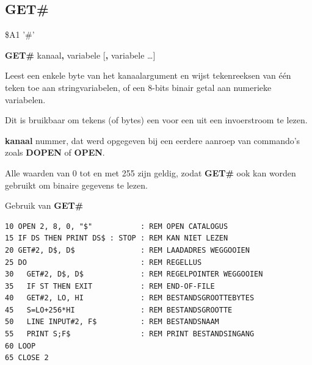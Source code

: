 \subsection{GET\#}
\begin{description}[leftmargin=2cm,style=nextline]
\item [Token:]    \$A1 '\#'

\item [Formaat:]   {\bf GET\#} kanaal{\bf,} variabele [{\bf,} variabele \dots]

\item [Gebruik:]    Leest een enkele byte van het kanaalargument en wijst tekenreeksen van één teken toe aan stringvariabelen, of een 8-bits binair getal aan numerieke variabelen.

                  Dit is bruikbaar om tekens (of bytes) een voor een uit een invoerstroom te lezen.

                  {\bf kanaal} nummer, dat werd opgegeven bij een eerdere aanroep van commando's zoals {\bf DOPEN} of {\bf OPEN}.

\item [Opmerkingen:]  Alle waarden van 0 tot en met 255 zijn geldig, zodat {\bf GET\#} ook kan worden gebruikt om binaire gegevens te lezen.

\item [Voorbeeld:]  Gebruik van {\bf GET\#}

\begin{tcolorbox}[colback=black,coltext=white]
\verbatimfont{\codefont}
\begin{verbatim}
10 OPEN 2, 8, 0, "$"           : REM OPEN CATALOGUS
15 IF DS THEN PRINT DS$ : STOP : REM KAN NIET LEZEN
20 GET#2, D$, D$               : REM LAADADRES WEGGOOIEN
25 DO                          : REM REGELLUS
30   GET#2, D$, D$             : REM REGELPOINTER WEGGOOIEN
35   IF ST THEN EXIT           : REM END-OF-FILE
40   GET#2, LO, HI             : REM BESTANDSGROOTTEBYTES
45   S=LO+256*HI               : REM BESTANDSGROOTTE
50   LINE INPUT#2, F$          : REM BESTANDSNAAM
55   PRINT S;F$                : REM PRINT BESTANDSINGANG
60 LOOP
65 CLOSE 2
\end{verbatim}
\end{tcolorbox}
\end{description}


\newpage
